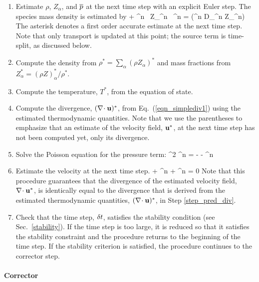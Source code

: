 \begin{enumerate}
\item Estimate $\rho$, $Z_\alpha$, and $\overline{p}$ at the next time step with an explicit Euler step. The species mass density is estimated by
\be {} + \nabla\!\cdot \rho^n \, Z_\alpha^n \, \bu^n = \nabla\!\cdot (\rho^n D_\alpha^n \nabla Z_\alpha^n) \ee
The asterisk denotes a first order accurate estimate at the next time step.  Note that only transport is updated at this point; the source term is time-split, as discussed below.

\item Compute the density from $\rho^* = \sum_\alpha (\rho Z_\alpha)^*$ and mass fractions from $Z_\alpha^* = (\rho Z)_\alpha^*/\rho^*$.

\item Compute the temperature, $T^*$, from the equation of state.

\item \label{step_pred_div} Compute the divergence, $(\nabla\!\cdot {\mathbf{u}})^*$, from Eq.~(\ref{eqn_simplediv1}) using the estimated thermodynamic quantities. Note that we use the parentheses to emphasize that an estimate of the velocity field, ${\mathbf{u}}^*$, at the next time step has not been computed yet, only its divergence.

\item Solve the Poisson equation for the pressure term:
\be \nabla^2 \cH^n = -  - \nabla\!\cdot \bF^n \ee

\item Estimate the velocity at the next time step.
\be
{} +  \bF^n + \nabla \cH^n = 0
\ee
Note that this procedure guarantees that the divergence of the estimated velocity field, $\nabla\!\cdot {\mathbf{u}}^*$, is identically
equal to the divergence that is derived from the estimated thermodynamic quantities, $(\nabla\!\cdot {\mathbf{u}})^*$, in Step \ref{step_pred_div}.

\item Check that the time step, $\delta t$, satisfies the stability condition (see Sec.~\ref{stability}).
If the time step is too large, it is reduced so that it satisfies
the stability constraint and the procedure returns to the beginning of the time step.
If the stability criterion is satisfied, the procedure continues to the corrector step.
\end{enumerate}

\paragraph{Corrector}

